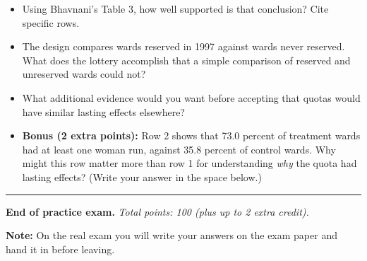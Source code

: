 \documentclass[
]{article}
\providecommand{\tightlist}{%
  \setlength{\itemsep}{0pt}\setlength{\parskip}{0pt}}
\begin{document}
\begin{itemize}
\tightlist
\item
  Using Bhavnani's Table 3, how well supported is that conclusion? Cite
  specific rows.
\item
  The design compares wards reserved in 1997 against wards never
  reserved. What does the lottery accomplish that a simple comparison of
  reserved and unreserved wards could not?
\item
  What additional evidence would you want before accepting that quotas
  would have similar lasting effects elsewhere?
\item
  \textbf{Bonus (2 extra points):} Row 2 shows that 73.0 percent of
  treatment wards had at least one woman run, against 35.8 percent of
  control wards. Why might this row matter more than row 1 for
  understanding \emph{why} the quota had lasting effects? (Write your
  answer in the space below.)
\end{itemize}

\vspace{5cm}

\begin{center}\rule{0.5\linewidth}{0.5pt}\end{center}

\textbf{End of practice exam.} \emph{Total points: 100 (plus up to 2
extra credit).}

\vspace{0.5cm}

\textbf{Note:} On the real exam you will write your answers on the exam
paper and hand it in before leaving.
\end{document}
